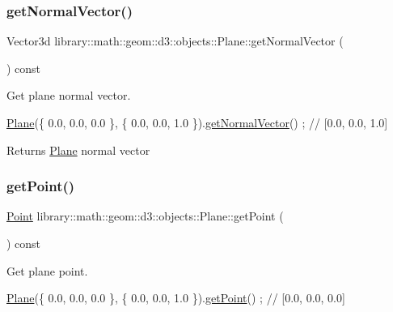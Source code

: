 \subsubsection{\texorpdfstring{get\+Normal\+Vector()}{getNormalVector()}}
{\footnotesize\ttfamily Vector3d library\+::math\+::geom\+::d3\+::objects\+::\+Plane\+::get\+Normal\+Vector (\begin{DoxyParamCaption}{ }\end{DoxyParamCaption}) const}



Get plane normal vector. 


\begin{DoxyCode}
\hyperlink{classlibrary_1_1math_1_1geom_1_1d3_1_1objects_1_1_plane_a81fe78a983e2cb6ee6ad9bfabd22c3a4}{Plane}(\{ 0.0, 0.0, 0.0 \}, \{ 0.0, 0.0, 1.0 \}).\hyperlink{classlibrary_1_1math_1_1geom_1_1d3_1_1objects_1_1_plane_a9d34608a389d4c80dad6b6f58b82c0e4}{getNormalVector}() ; \textcolor{comment}{// [0.0, 0.0, 1.0]}
\end{DoxyCode}


\begin{DoxyReturn}{Returns}
\hyperlink{classlibrary_1_1math_1_1geom_1_1d3_1_1objects_1_1_plane}{Plane} normal vector 
\end{DoxyReturn}
\mbox{\label{classlibrary_1_1math_1_1geom_1_1d3_1_1objects_1_1_plane_a52f9167ca123019c4b303c19b696b886}} 
\subsubsection{\texorpdfstring{get\+Point()}{getPoint()}}
{\footnotesize\ttfamily \hyperlink{classlibrary_1_1math_1_1geom_1_1d3_1_1objects_1_1_point}{Point} library\+::math\+::geom\+::d3\+::objects\+::\+Plane\+::get\+Point (\begin{DoxyParamCaption}{ }\end{DoxyParamCaption}) const}



Get plane point. 


\begin{DoxyCode}
\hyperlink{classlibrary_1_1math_1_1geom_1_1d3_1_1objects_1_1_plane_a81fe78a983e2cb6ee6ad9bfabd22c3a4}{Plane}(\{ 0.0, 0.0, 0.0 \}, \{ 0.0, 0.0, 1.0 \}).\hyperlink{classlibrary_1_1math_1_1geom_1_1d3_1_1objects_1_1_plane_a52f9167ca123019c4b303c19b696b886}{getPoint}() ; \textcolor{comment}{// [0.0, 0.0, 0.0]}
\end{DoxyCode}


